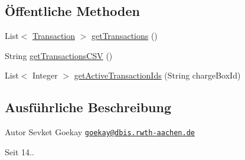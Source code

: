 \subsection*{Öffentliche Methoden}
\begin{DoxyCompactItemize}
\item 
List$<$ \hyperlink{classde_1_1rwth_1_1idsg_1_1steve_1_1repository_1_1dto_1_1_transaction}{Transaction} $>$ \hyperlink{classde_1_1rwth_1_1idsg_1_1steve_1_1repository_1_1_transaction_repository_impl_a6a5016b66da0f812e3fd3440f884ea99}{get\-Transactions} ()
\item 
String \hyperlink{classde_1_1rwth_1_1idsg_1_1steve_1_1repository_1_1_transaction_repository_impl_a43c8f4ebe893eaea8a463602b5a6a2e8}{get\-Transactions\-C\-S\-V} ()
\item 
List$<$ Integer $>$ \hyperlink{classde_1_1rwth_1_1idsg_1_1steve_1_1repository_1_1_transaction_repository_impl_aadb16e491a609c3dc301d34602d5ea29}{get\-Active\-Transaction\-Ids} (String charge\-Box\-Id)
\end{DoxyCompactItemize}


\subsection{Ausführliche Beschreibung}
\begin{DoxyAuthor}{Autor}
Sevket Goekay \href{mailto:goekay@dbis.rwth-aachen.de}{\tt goekay@dbis.\-rwth-\/aachen.\-de} 
\end{DoxyAuthor}
\begin{DoxySince}{Seit}
14.. 
\end{DoxySince}


